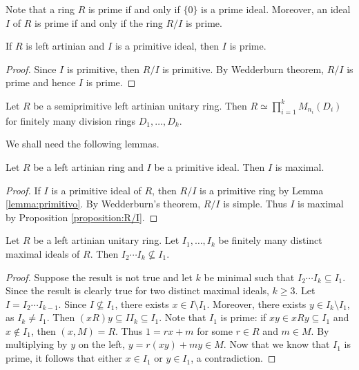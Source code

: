 Note that a ring $R$ is prime if and only if $\{0\}$ is a prime ideal. 
Moreover, 
an ideal $I$ of $R$ is prime if and only if 
the ring $R/I$ is prime. 

\begin{lemma}
    If $R$ is left artinian and $I$ is a primitive ideal, then
    $I$ is prime. 
\end{lemma}


\begin{proof}
    Since $I$ is primitive, then $R/I$ is primitive. By Wedderburn theorem, 
    $R/I$ is prime and hence $I$ is prime. 
\end{proof}

\begin{theorem}
\label{thm:ArtinWedderburn_version2}
    Let $R$ be a semiprimitive left artinian unitary ring. Then
    $R\simeq\prod_{i=1}^kM_{n_i}(D_i)$ for finitely many
    division rings $D_1,\dots,D_k$. 
\end{theorem}

We shall need the following lemmas.

\begin{lemma}
\label{lem:primitive=>maximal}
    Let $R$ be a left artinian ring and $I$ be a primitive ideal. 
    Then $I$ is maximal. 
\end{lemma}

\begin{proof}
    If $I$ is a primitive ideal of $R$, then $R/I$ is a primitive ring
    by Lemma \ref{lemma:primitivo}. By Wedderburn's theorem, $R/I$ is
    simple. Thus $I$ is maximal by Proposition \ref{proposition:R/I}. 
\end{proof}

\begin{lemma}
    Let $R$ be a left artinian unitary ring.
    Let $I_1,\dots,I_k$ be finitely many distinct maximal ideals of $R$. 
    Then $I_2\cdots I_k\not\subseteq I_1$.   
\end{lemma}

\begin{proof}
    Suppose the result is not true and let $k$ be minimal
    such that $I_2\cdots I_k\subseteq I_1$. Since the result is clearly
    true for two distinct maximal ideals, $k\geq3$. Let $I=I_2\cdots I_{k-1}$. 
    Since $I\not\subseteq I_1$, there exists $x\in I\setminus I_1$. Moreover,  
    there exists $y\in I_k\setminus I_1$, as 
    $I_k\ne I_1$. 
    Then 
    $(xR)y\subseteq II_k\subseteq I_1$. Note that $I_1$ is prime: if $xy\in xRy\subseteq I_1$ and $x\not\in I_1$, 
    then $(x,M)=R$. Thus $1=rx+m$ for some $r\in R$ and $m\in M$. By multiplying by $y$ on the left, 
    $y=r(xy)+my\in M$. Now that we know that $I_1$ is prime, 
    it follows that either $x\in I_1$ or $y\in I_1$, a contradiction.   
\end{proof}

